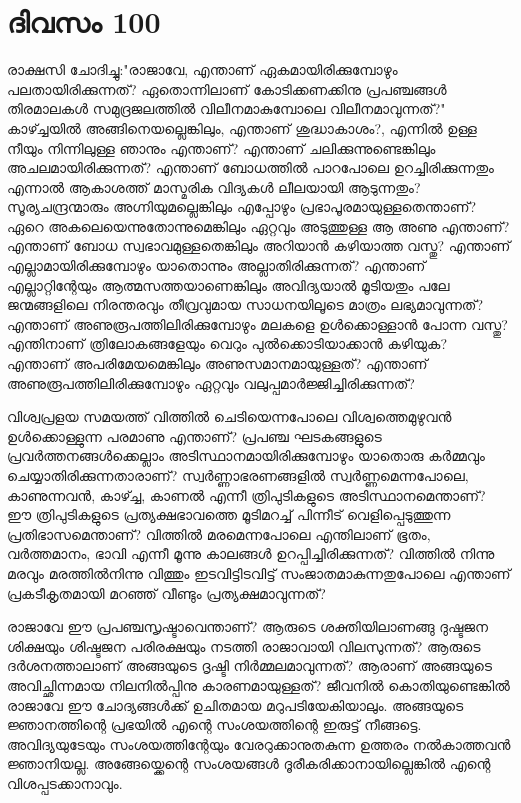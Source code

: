 \newpage
\section{ദിവസം 100}


രാക്ഷസി ചോദിച്ചു:"രാജാവേ, എന്താണ്‌ ഏകമായിരിക്കുമ്പോഴും പലതായിരിക്കുന്നത്‌? ഏതൊന്നിലാണ്‌ കോടിക്കണക്കിനു പ്രപഞ്ചങ്ങള്‍ തിരമാലകള്‍ സമുദ്രജലത്തില്‍ വിലീനമാകുമ്പോലെ വിലീനമാവുന്നത്‌?" കാഴ്ച്ചയില്‍ അങ്ങിനെയല്ലെങ്കിലും, എന്താണ്‌ ശുദ്ധാകാശം?,  എന്നില്‍ ഉള്ള നീയും നിന്നിലുള്ള ഞാനും എന്താണ്‌? എന്താണ്‌ ചലിക്കുന്നുണ്ടെങ്കിലും അചലമായിരിക്കുന്നത്‌? എന്താണ്‌ ബോധത്തില്‍ പാറപോലെ ഉറച്ചിരിക്കുന്നതും എന്നാല്‍ ആകാശത്ത്‌ മാസ്മരിക വിദ്യകള്‍ ലീലയായി ആടുന്നതും? സൂര്യചന്ദ്രന്മാരും അഗ്നിയുമല്ലെങ്കിലും എപ്പോഴും പ്രഭാപൂരമായുള്ളതെന്താണ്‌? ഏറെ അകലെയെന്നുതോന്നുമെങ്കിലും ഏറ്റവും അടുത്തുള്ള ആ അണു എന്താണ്‌? എന്താണ്‌ ബോധ സ്വഭാവമുള്ളതെങ്കിലും അറിയാന്‍ കഴിയാത്ത വസ്തു? എന്താണ്‌ എല്ലാമായിരിക്കുമ്പോഴും യാതൊന്നും അല്ലാതിരിക്കുന്നത്‌? എന്താണ്‌ എല്ലാറ്റിന്റേയും ആത്മസത്തയാണെങ്കിലും അവിദ്യയാല്‍ മൂടിയതും പലേ ജന്മങ്ങളിലെ നിരന്തരവും തീവ്രവുമായ സാധനയിലൂടെ മാത്രം ലഭ്യമാവുന്നത്‌? എന്താണ്‌ അണുരൂപത്തിലിരിക്കുമ്പോഴും മലകളെ ഉള്‍ക്കൊള്ളാന്‍ പോന്ന വസ്തു? എന്തിനാണ്‌ ത്രിലോകങ്ങളേയും വെറും പുല്‍ക്കൊടിയാക്കാന്‍ കഴിയുക? എന്താണ്‌ അപരിമേയമെങ്കിലും അണുസമാനമായുള്ളത്‌? എന്താണ്‌ അണുരൂപത്തിലിരിക്കുമ്പോഴും ഏറ്റവും വലുപ്പമാര്‍ജ്ജിച്ചിരിക്കുന്നത്‌? 

വിശ്വപ്രളയ സമയത്ത്‌ വിത്തില്‍ ചെടിയെന്നപോലെ വിശ്വത്തെമുഴുവന്‍ ഉള്‍ക്കൊള്ളുന്ന പരമാണു എന്താണ്‌? പ്രപഞ്ച ഘടകങ്ങളുടെ പ്രവര്‍ത്തനങ്ങള്‍ക്കെല്ലാം അടിസ്ഥാനമായിരിക്കുമ്പോഴും യാതൊരു കര്‍മ്മവും ചെയ്യാതിരിക്കുന്നതാരാണ്‌? സ്വര്‍ണ്ണാഭരണങ്ങളില്‍ സ്വര്‍ണ്ണമെന്നപോലെ, കാണുന്നവന്‍, കാഴ്ച്ച, കാണല്‍ എന്നീ ത്രിപുടികളുടെ അടിസ്ഥാനമെന്താണ്‌? ഈ ത്രിപുടികളുടെ പ്രത്യക്ഷഭാവത്തെ മൂടിമറച്ച്‌ പിന്നീട്‌ വെളിപ്പെടുത്തുന്ന പ്രതിഭാസമെന്താണ്‌? വിത്തില്‍ മരമെന്നപോലെ എന്തിലാണ്‌ ഭൂതം, വര്‍ത്തമാനം, ഭാവി എന്നീ മൂന്നു കാലങ്ങള്‍ ഉറപ്പിച്ചിരിക്കുന്നത്‌? വിത്തില്‍ നിന്നു മരവും മരത്തില്‍നിന്നു വിത്തും ഇടവിട്ടിടവിട്ട്‌ സംജാതമാകുന്നതുപോലെ എന്താണ്‌ പ്രകടീകൃതമായി മറഞ്ഞ്‌ വീണ്ടും പ്രത്യക്ഷമാവുന്നത്‌? 

രാജാവേ ഈ പ്രപഞ്ചസൃഷ്ടാവെന്താണ്‌? ആരുടെ ശക്തിയിലാണങ്ങു ദുഷ്ടജന ശിക്ഷയും ശിഷ്ടജന പരിരക്ഷയും നടത്തി രാജാവായി വിലസുന്നത്‌? ആരുടെ ദര്‍ശനത്താലാണ്‌ അങ്ങയുടെ ദൃഷ്ടി നിര്‍മ്മലമാവുന്നത്‌? ആരാണ്‌ അങ്ങയുടെ അവിച്ഛിന്നമായ നിലനില്‍പ്പിനു കാരണമായുള്ളത്‌? ജീവനില്‍ കൊതിയുണ്ടെങ്കില്‍ രാജാവേ ഈ ചോദ്യങ്ങള്‍ക്ക്‌ ഉചിതമായ മറുപടിയേകിയാലും. അങ്ങയുടെ ജ്ഞാനത്തിന്റെ പ്രഭയില്‍ എന്റെ സംശയത്തിന്റെ ഇരുട്ട്‌ നീങ്ങട്ടെ. അവിദ്യയുടേയും സംശയത്തിന്റേയും വേരറുക്കാനുതകുന്ന ഉത്തരം നല്‍കാത്തവന്‍ ജ്ഞാനിയല്ല. അങ്ങേയ്ക്കെന്റെ സംശയങ്ങള്‍ ദൂരീകരിക്കാനായില്ലെങ്കില്‍ എന്റെ വിശപ്പടക്കാനാവും.
